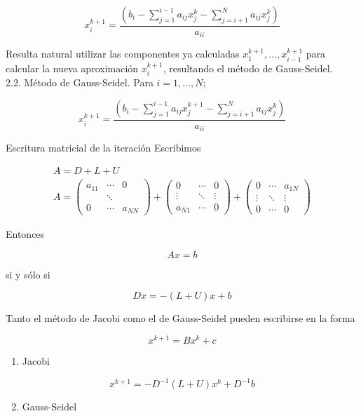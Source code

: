\documentclass[10pt]{book}
\begin{document}
$$
x_{i}^{k+1}=\frac{\left(b_{i}-\sum_{j=1}^{i-1} a_{i j} x_{j}^{k}-\sum_{j=i+1}^{N} a_{i j} x_{j}^{k}\right)}{a_{i i}}
$$

Resulta natural utilizar las componentes ya calculadas $x_{1}^{k+1}, \ldots, x_{i-1}^{k+1}$ para calcular la nueva aproximación $x_{i}^{k+1}$, resultando el método de Gauss-Seidel.\\
2.2. Método de Gauss-Seidel. Para $i=1, \ldots, N$;

$$
x_{i}^{k+1}=\frac{\left(b_{i}-\sum_{j=1}^{i-1} a_{i j} x_{j}^{k+1}-\sum_{j=i+1}^{N} a_{i j} x_{j}^{k}\right)}{a_{i i}}
$$

Escritura matricial de la iteración Escribimos

$$
\begin{gathered}
A=D+L+U \\
A=\left(\begin{array}{ccc}
a_{11} & \cdots & 0 \\
& \ddots & \\
0 & \cdots & a_{N N}
\end{array}\right)+\left(\begin{array}{ccc}
0 & \cdots & 0 \\
\vdots & \ddots & \vdots \\
a_{N 1} & \cdots & 0
\end{array}\right)+\left(\begin{array}{ccc}
0 & \cdots & a_{1 N} \\
\vdots & \ddots & \vdots \\
0 & \cdots & 0
\end{array}\right)
\end{gathered}
$$

Entonces

$$
A x=b
$$

si y sólo si

$$
D x=-(L+U) x+b
$$

Tanto el método de Jacobi como el de Gauss-Seidel pueden escribirse en la forma

$$
x^{k+1}=B x^{k}+c
$$

\begin{enumerate}
  \item Jacobi
\end{enumerate}

$$
x^{k+1}=-D^{-1}(L+U) x^{k}+D^{-1} b
$$

\begin{enumerate}
  \setcounter{enumi}{1}
  \item Gauss-Seidel
\end{enumerate}
\end{document}
